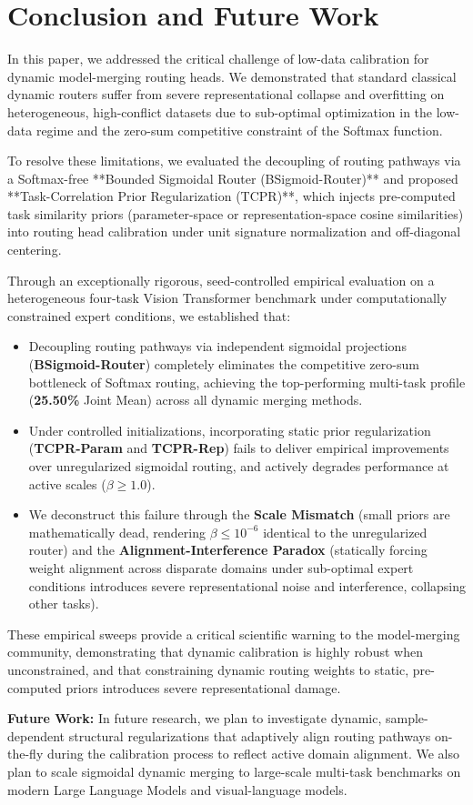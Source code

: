 \section{Conclusion and Future Work}
\label{sec:conclusion}

In this paper, we addressed the critical challenge of low-data calibration for dynamic model-merging routing heads. We demonstrated that standard classical dynamic routers suffer from severe representational collapse and overfitting on heterogeneous, high-conflict datasets due to sub-optimal optimization in the low-data regime and the zero-sum competitive constraint of the Softmax function.

To resolve these limitations, we evaluated the decoupling of routing pathways via a Softmax-free **Bounded Sigmoidal Router (BSigmoid-Router)** and proposed **Task-Correlation Prior Regularization (TCPR)**, which injects pre-computed task similarity priors (parameter-space or representation-space cosine similarities) into routing head calibration under unit signature normalization and off-diagonal centering.

Through an exceptionally rigorous, seed-controlled empirical evaluation on a heterogeneous four-task Vision Transformer benchmark under computationally constrained expert conditions, we established that:
\begin{itemize}
    \item Decoupling routing pathways via independent sigmoidal projections (\textbf{BSigmoid-Router}) completely eliminates the competitive zero-sum bottleneck of Softmax routing, achieving the top-performing multi-task profile (\textbf{25.50\%} Joint Mean) across all dynamic merging methods.
    \item Under controlled initializations, incorporating static prior regularization (\textbf{TCPR-Param} and \textbf{TCPR-Rep}) fails to deliver empirical improvements over unregularized sigmoidal routing, and actively degrades performance at active scales ($\beta \ge 1.0$).
    \item We deconstruct this failure through the \textbf{Scale Mismatch} (small priors are mathematically dead, rendering $\beta \le 10^{-6}$ identical to the unregularized router) and the \textbf{Alignment-Interference Paradox} (statically forcing weight alignment across disparate domains under sub-optimal expert conditions introduces severe representational noise and interference, collapsing other tasks).
\end{itemize}
These empirical sweeps provide a critical scientific warning to the model-merging community, demonstrating that dynamic calibration is highly robust when unconstrained, and that constraining dynamic routing weights to static, pre-computed priors introduces severe representational damage.

\textbf{Future Work:} In future research, we plan to investigate dynamic, sample-dependent structural regularizations that adaptively align routing pathways on-the-fly during the calibration process to reflect active domain alignment. We also plan to scale sigmoidal dynamic merging to large-scale multi-task benchmarks on modern Large Language Models and visual-language models.
